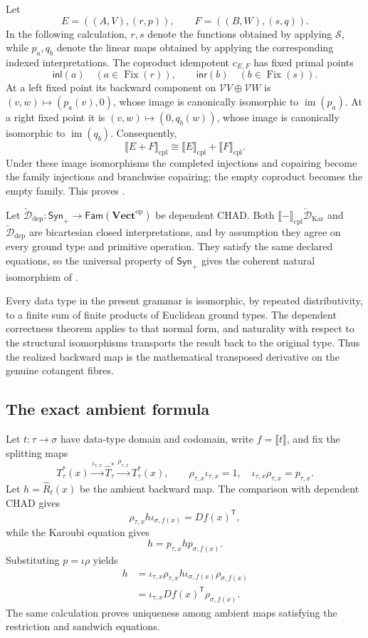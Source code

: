 \documentclass[runningheads,envcountsame]{llncs}
\newcommand{\Vectop}{\mathbf{Vect}^{\mathrm{op}}}
\newcommand{\Synp}{\mathsf{Syn}_{+}}
\newcommand{\Fam}{\mathsf{Fam}}
\newcommand{\Fix}{\operatorname{Fix}}
\newcommand{\im}{\operatorname{im}}
\newcommand{\Ddep}{\overleftarrow{\mathcal D}_{\mathrm{dep}}}
\newcommand{\DKar}{\overleftarrow{\mathcal D}_{\mathrm{Kar}}}
\begin{document}
Let
$$
E=((A,V),(r,p)),
\qquad
F=((B,W),(s,q)).
$$
In the following calculation, $r,s$ denote the functions obtained by applying
$\mathcal S$, while $p_a,q_b$ denote the linear maps obtained by applying the
corresponding indexed interpretations. The coproduct idempotent $c_{E,F}$ has
fixed primal points
$$
\mathsf{inl}(a)\quad(a\in\Fix(r)),
\qquad
\mathsf{inr}(b)\quad(b\in\Fix(s)).
$$
At a left fixed point its backward component on
$\mathcal V V\oplus\mathcal V W$ is
$(v,w)\mapsto(p_a(v),0)$, whose image is canonically isomorphic to
$\im(p_a)$. At a right fixed point it is
$(v,w)\mapsto(0,q_b(w))$, whose image is canonically isomorphic to
$\im(q_b)$. Consequently,
$$
\llbracket E+F\rrbracket_{\mathrm{cpl}}
\cong
\llbracket E\rrbracket_{\mathrm{cpl}}
+
\llbracket F\rrbracket_{\mathrm{cpl}}.
$$
Under these image isomorphisms the completed injections and copairing become
the family injections and branchwise copairing; the empty coproduct becomes the
empty family. This proves .

Let $\Ddep:\Synp\to\Fam(\Vectop)$ be dependent CHAD. Both
$\llbracket-\rrbracket_{\mathrm{cpl}}\DKar$ and $\Ddep$ are bicartesian closed
interpretations, and by assumption they agree on every ground type and
primitive operation. They satisfy the same declared equations, so the universal
property of $\Synp$ gives the coherent natural isomorphism of
.

Every data type in the present grammar is isomorphic, by repeated distributivity,
to a finite sum of finite products of Euclidean ground types. The dependent
correctness theorem applies to that normal form, and naturality with respect to
the structural isomorphisms transports the result back to the original type.
Thus the realized backward map is the mathematical transposed derivative on the
genuine cotangent fibres.

\subsection{The exact ambient formula}

Let $t:\tau\to\sigma$ have data-type domain and codomain, write
$f=\llbracket t\rrbracket$, and fix the splitting maps
$$
T^*_\tau(x)
\xrightarrow{\iota_{\tau,x}}
\widehat T^*_\tau
\xrightarrow{\rho_{\tau,x}}
T^*_\tau(x),
\qquad
\rho_{\tau,x}\iota_{\tau,x}=1,
\quad
\iota_{\tau,x}\rho_{\tau,x}=p_{\tau,x}.
$$
Let $h=\widehat R_t(x)$ be the ambient backward map. The comparison with
dependent CHAD gives
$$
\rho_{\tau,x}h\iota_{\sigma,f(x)}
=
Df(x)^{\mathsf T},
$$
while the Karoubi equation gives
$$
h=p_{\tau,x}hp_{\sigma,f(x)}.
$$
Substituting $p=\iota\rho$ yields
$$
\begin{aligned}
h
&=
\iota_{\tau,x}\rho_{\tau,x}
 h
\iota_{\sigma,f(x)}\rho_{\sigma,f(x)}\\
&=
\iota_{\tau,x}
Df(x)^{\mathsf T}
\rho_{\sigma,f(x)}.
\end{aligned}
$$
The same calculation proves uniqueness among ambient maps satisfying the
restriction and sandwich equations.
\end{document}
